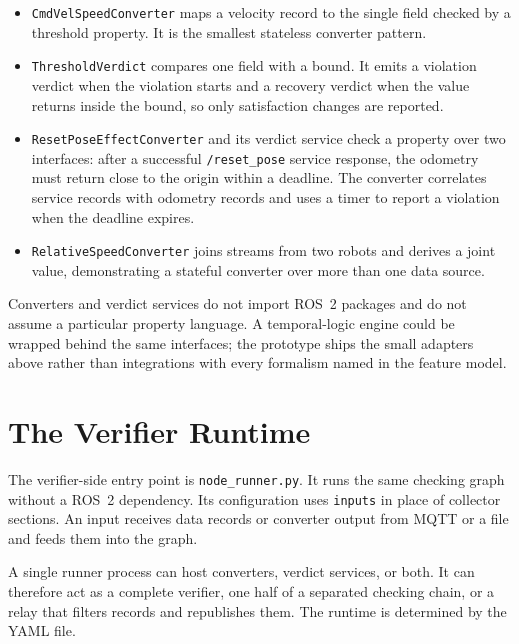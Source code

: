 \begin{itemize}
    \item \texttt{CmdVelSpeedConverter} maps a velocity record to the single
    field checked by a threshold property. It is the smallest stateless
    converter pattern.

    \item \texttt{ThresholdVerdict} compares one field with a bound. It emits a
    violation verdict when the violation starts and a recovery verdict when
    the value returns inside the bound, so only satisfaction changes are
    reported.

    \item \texttt{ResetPoseEffectConverter} and its verdict service check a
    property over two interfaces: after a successful \texttt{/reset\_pose}
    service response, the odometry must return close to the origin within a
    deadline. The converter correlates service records with odometry records
    and uses a timer to report a violation when the deadline expires.

    \item \texttt{RelativeSpeedConverter} joins streams from two robots and
    derives a joint value, demonstrating a stateful converter over more than
    one data source.
\end{itemize}

Converters and verdict services do not import ROS~2 packages and do not assume
a particular property language. A temporal-logic engine could be wrapped
behind the same interfaces; the prototype ships the small adapters above
rather than integrations with every formalism named in the feature model.

\section{The Verifier Runtime}\label{sec:impl-node-runner}

The verifier-side entry point is \texttt{node\_runner.py}. It runs the same
checking graph without a ROS~2 dependency. Its configuration uses
\texttt{inputs} in place of collector sections. An input receives data records
or converter output from MQTT or a file and feeds them into the graph.

A single runner process can host converters, verdict services, or both. It can
therefore act as a complete verifier, one half of a separated checking chain,
or a relay that filters records and republishes them. The runtime is
determined by the YAML file.

